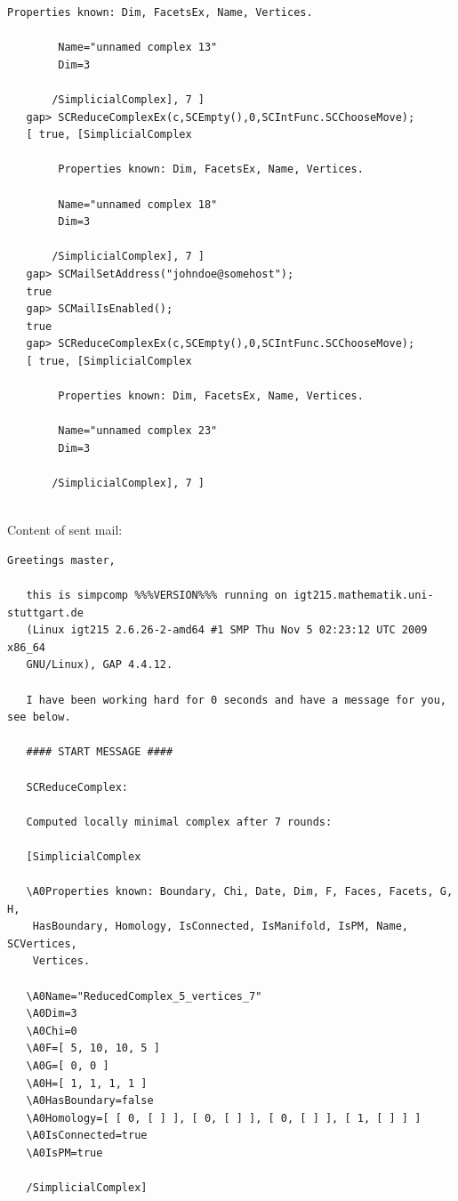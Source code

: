 \documentclass[a4paper,11pt]{report}
\begin{document}
{{{\begin{Verbatim}[commandchars=!|G,fontsize=\small,frame=single,label=Example]
        Properties known: Dim, FacetsEx, Name, Vertices.
       
        Name="unnamed complex 13"
        Dim=3
       
       /SimplicialComplex], 7 ]
   gap> SCReduceComplexEx(c,SCEmpty(),0,SCIntFunc.SCChooseMove);
   [ true, [SimplicialComplex
       
        Properties known: Dim, FacetsEx, Name, Vertices.
       
        Name="unnamed complex 18"
        Dim=3
       
       /SimplicialComplex], 7 ]
   gap> SCMailSetAddress("johndoe@somehost");   
   true
   gap> SCMailIsEnabled();                     
   true
   gap> SCReduceComplexEx(c,SCEmpty(),0,SCIntFunc.SCChooseMove);
   [ true, [SimplicialComplex
       
        Properties known: Dim, FacetsEx, Name, Vertices.
       
        Name="unnamed complex 23"
        Dim=3
       
       /SimplicialComplex], 7 ]
   
\end{Verbatim}
 Content of sent mail: 
\begin{Verbatim}[commandchars=@|J,fontsize=\small,frame=single,label=Example]
   Greetings master,
   
   this is simpcomp %%%VERSION%%% running on igt215.mathematik.uni-stuttgart.de
   (Linux igt215 2.6.26-2-amd64 #1 SMP Thu Nov 5 02:23:12 UTC 2009 x86_64
   GNU/Linux), GAP 4.4.12.
   
   I have been working hard for 0 seconds and have a message for you, see below.
   
   #### START MESSAGE ####
   
   SCReduceComplex:
   
   Computed locally minimal complex after 7 rounds:
   
   [SimplicialComplex
   
   \A0Properties known: Boundary, Chi, Date, Dim, F, Faces, Facets, G, H,
    HasBoundary, Homology, IsConnected, IsManifold, IsPM, Name, SCVertices,
    Vertices.
   
   \A0Name="ReducedComplex_5_vertices_7"
   \A0Dim=3
   \A0Chi=0
   \A0F=[ 5, 10, 10, 5 ]
   \A0G=[ 0, 0 ]
   \A0H=[ 1, 1, 1, 1 ]
   \A0HasBoundary=false
   \A0Homology=[ [ 0, [ ] ], [ 0, [ ] ], [ 0, [ ] ], [ 1, [ ] ] ]
   \A0IsConnected=true
   \A0IsPM=true
   
   /SimplicialComplex]
   

\end{Verbatim}}}}
\end{document}
